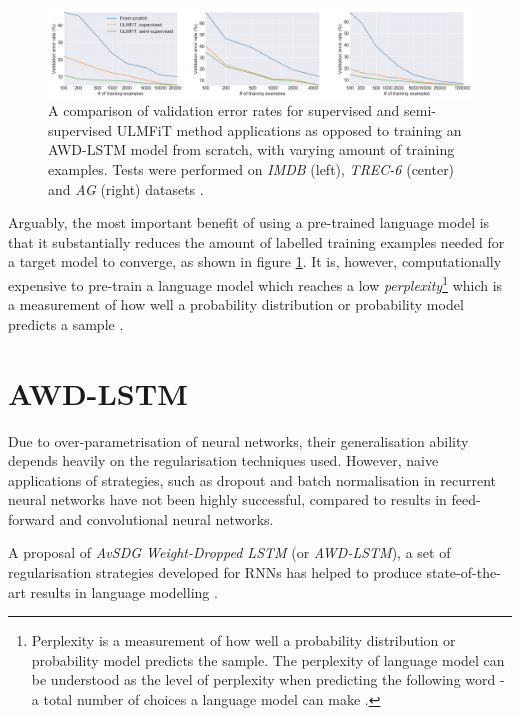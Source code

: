 \begin{figure}[]
\centering
\includegraphics[scale=0.33]{figures/ulmfit_results.png}
\caption{A comparison of validation error rates for supervised and semi-supervised ULMFiT method applications as opposed to training an AWD-LSTM model from scratch, with varying amount of training examples. Tests were performed on \emph{IMDB} (left), \emph{TREC-6} (center) and \emph{AG} (right) datasets  \cite{ulmfit}.}
\label{ulmfit:results}
\end{figure}

Arguably, the most important benefit of using a pre-trained language model is that it substantially reduces the amount of labelled training examples needed for a target model to converge, as shown in figure \ref{ulmfit:results}. It is, however, computationally expensive to pre-train a language model which reaches a low \emph{perplexity}\footnote{Perplexity is a measurement of how well a probability distribution or probability model predicts the sample. The perplexity of language model can be understood as the level of perplexity when predicting the following word - a total number of choices a language model can make \cite{perplexity}.} which is a measurement of how well a probability distribution or probability model predicts a sample \cite{state_of_nlp_2019}.

\section{AWD-LSTM}
\label{awdlstm}

Due to over-parametrisation of neural networks, their generalisation ability depends heavily on the regularisation techniques used. However, naive applications of strategies, such as dropout and batch normalisation in recurrent neural networks have not been highly successful, compared to results in feed-forward and convolutional neural networks. 

A proposal of \emph{AvSDG Weight-Dropped LSTM} (or \emph{AWD-LSTM}), a set of regularisation strategies developed for RNNs \cite{merity:awdlstm} has helped to produce state-of-the-art results in language modelling \cite{ulmfit:berlin}.

